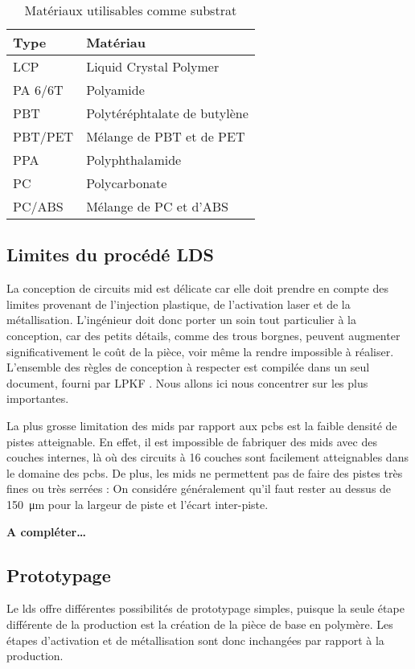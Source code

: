 \begin{table}[h]
\centering
\begin{tabular}{l l}
\toprule 
Type & Matériau \\
\midrule %
LCP & Liquid Crystal Polymer \\
PA 6/6T & Polyamide \\
PBT & Polytéréphtalate de butylène \\
PBT/PET & Mélange de PBT et de PET \\
PPA & Polyphthalamide \\
PC & Polycarbonate \\
PC/ABS & Mélange de PC et d'ABS \\ 
\bottomrule 
\end{tabular}
\caption{Matériaux utilisables comme substrat}
\label{tab:mid-materials}
\end{table}

\subsection{Limites du procédé LDS}
La conception de circuits \gls{mid} est délicate car elle doit prendre en compte des limites provenant de l'injection plastique, de l'activation laser et de la métallisation.
L'ingénieur doit donc porter un soin tout particulier à la conception, car des petits détails, comme des trous borgnes, peuvent augmenter significativement le coût de la pièce, voir même la rendre impossible à réaliser.
L'ensemble des règles de conception à respecter est compilée dans un seul document, fourni par LPKF \cite{mid-design-rules}.
Nous allons ici nous concentrer sur les plus importantes.

La plus grosse limitation des \glspl{mid} par rapport aux \glspl{pcb} est la faible densité de pistes atteignable.
En effet, il est impossible de fabriquer des \glspl{mid} avec des couches internes, là où des circuits à 16 couches sont facilement atteignables dans le domaine des \glspl{pcb}.
De plus, les \glspl{mid} ne permettent pas de faire des pistes très fines ou très serrées : On considére généralement qu'il faut rester au dessus de \SI{150}{\micro\meter} pour la largeur de piste et l'écart inter-piste.

\textbf{A compléter\ldots}


\subsection{Prototypage}
Le \gls{lds} offre différentes possibilités de prototypage simples, puisque la seule étape différente de la production est la 
création de la pièce de base en polymère. Les étapes d'activation et de métallisation sont donc inchangées par rapport à la production.

